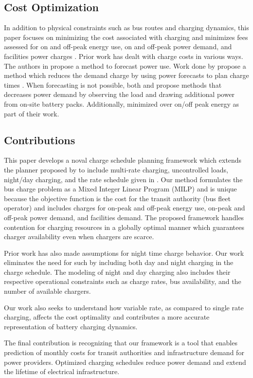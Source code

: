 \subsection{Cost Optimization}
In addition to physical constraints such as bus routes and charging dynamics, this paper focuses on minimizing the cost associated with charging and minimizes fees assessed for on and off-peak energy use, on and off-peak power demand, and facilities power charges \cite{noauthor_rocky_nodate}. Prior work has dealt with charge costs in various ways.  
The authors in \cite{gao_charging_2019} propose a method to forecast power use. Work done by \cite{qin_numerical_2016} propose a method which reduces the demand charge by using power forecasts to plan charge times \cite{gao_charging_2019}.  When forecasting is not possible, both \cite{ojer_development_2020} and \cite{cheng_smart_2020} propose methods that decreases power demand by observing the load and drawing additional power from on-site battery packs. Additionally, \cite{el-taweel_incorporation_2019} minimized over on/off peak energy as part of their work.
\subsection{Contributions}
This paper develops a noval charge schedule planning framework which extends the planner proposed by \cite{whitaker_network_2021} to include multi-rate charging, uncontrolled loads, night/day charging, and the rate schedule given in \cite{noauthor_rocky_nodate}. Our method formulates the bus charge problem as a Mixed Integer Linear Program (MILP) and is unique because the objective function is the cost for the transit authority (bus fleet operator) and includes charges for on-peak and off-peak energy use, on-peak and off-peak power demand, and facilities demand. The proposed framework handles contention for charging resources in a globally optimal manner which guarantees charger availability even when chargers are scarce.
\par Prior work has also made assumptions for night time charge behavior. Our work eliminates the need for such by including both day and night charging in the charge schedule. The modeling of night and day charging also includes their respective operational constraints such as charge rates, bus availability, and the number of available chargers.
\par Our work also seeks to understand how variable rate, as compared to single rate charging, affects the cost optimality and contributes a more accurate representation of battery charging dynamics. 
\par The final contribution is recognizing that our framework is a tool that enables prediction of monthly costs for transit authorities and infrastructure demand for power providers.  Optimized charging schedules reduce power demand and extend the lifetime of electrical infrastructure.

